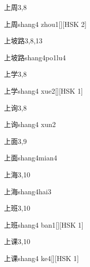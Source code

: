 \begin{entry}{上周}{3,8}
  \begin{phonetics}{上周}{shang4 zhou1}[][HSK 2]
  \end{phonetics}
\end{entry}

\begin{entry}{上坡路}{3,8,13}
  \begin{phonetics}{上坡路}{shang4po1lu4}
  \end{phonetics}
\end{entry}

\begin{entry}{上学}{3,8}
  \begin{phonetics}{上学}{shang4 xue2}[][HSK 1]
  \end{phonetics}
\end{entry}

\begin{entry}{上询}{3,8}
  \begin{phonetics}{上询}{shang4 xun2}
  \end{phonetics}
\end{entry}

\begin{entry}{上面}{3,9}
  \begin{phonetics}{上面}{shang4mian4}
  \end{phonetics}
\end{entry}

\begin{entry}{上海}{3,10}
  \begin{phonetics}{上海}{shang4hai3}
  \end{phonetics}
\end{entry}

\begin{entry}{上班}{3,10}
  \begin{phonetics}{上班}{shang4 ban1}[][HSK 1]
  \end{phonetics}
\end{entry}

\begin{entry}{上课}{3,10}
  \begin{phonetics}{上课}{shang4 ke4}[][HSK 1]
  \end{phonetics}
\end{entry}

